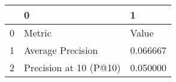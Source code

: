 \begin{tabular}{lll}
\toprule
 & 0 & 1 \\
\midrule
0 & Metric & Value \\
1 & Average Precision & 0.066667 \\
2 & Precision at 10 (P@10) & 0.050000 \\
\bottomrule
\end{tabular}
